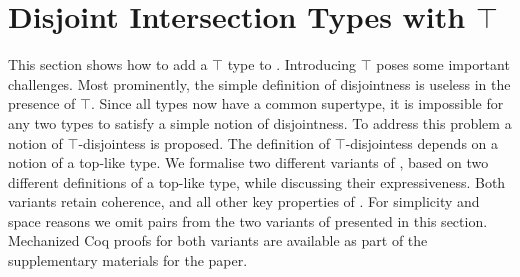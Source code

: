 \section{Disjoint Intersection Types with $\top$}\label{sec:top}

This section shows how to add a $\top$ type to \name.
Introducing $\top$ poses some important challenges. Most prominently,
the simple definition of disjointness is useless in the presence of
$\top$. Since all types now have a common supertype, it is impossible
for any two types to satisfy a simple notion of disjointness. To
address this problem a notion of $\top$-disjointess is proposed.  The
definition of $\top$-disjointess depends on a notion of a top-like
type. We formalise two different variants of \name, based on two different
definitions of a top-like type, while discussing their expressiveness. Both variants retain coherence, and all other key
properties of \name.  For simplicity and space reasons we omit pairs
from the two variants of \name presented in this section.
Mechanized Coq proofs for both variants are available as part of the 
supplementary materials for the paper.



